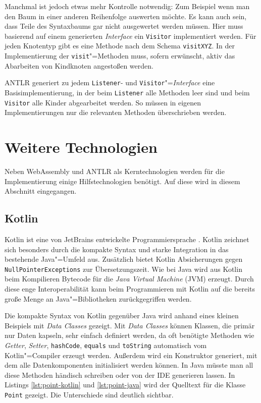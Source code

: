 Manchmal ist jedoch etwas mehr Kontrolle notwendig: Zum Beispiel wenn man den Baum in einer anderen Reihenfolge auswerten möchte. Es kann auch sein, dass Teile des Syntaxbaums gar nicht ausgewertet werden müssen. Hier muss basierend auf einem generierten \emph{Interface} ein \lstinline{Visitor} implementiert werden. Für jeden Knotentyp gibt es eine Methode nach dem Schema \lstinline{visitXYZ}. In der Implementierung der \lstinline{visit}"=Methoden muss, sofern erwünscht, aktiv das Abarbeiten von Kindknoten angestoßen werden.

ANTLR generiert zu jedem \lstinline{Listener}- und \lstinline{Visitor}"=\emph{Interface} eine Basisimplementierung, in der beim \lstinline{Listener} alle Methoden leer sind und beim \lstinline{Visitor} alle Kinder abgearbeitet werden. So müssen in eigenen Implementierungen nur die relevanten Methoden überschrieben werden.

\pagebreak
\section{Weitere Technologien}

Neben WebAssembly und ANTLR als Kerntechnologien werden für die Implementierung einige Hilfstechnologien benötigt. Auf diese wird in diesem Abschnitt eingegangen.

\subsection{Kotlin}
\label{subsec:Kotlin}

Kotlin ist eine von JetBrains entwickelte Programmiersprache \cite{KotlinReference}. Kotlin zeichnet sich besonders durch die kompakte Syntax und starke Integration in das bestehende Java"=Umfeld aus. Zusätzlich bietet Kotlin Absicherungen gegen \lstinline{NullPointerExceptions} zur Übersetzungszeit. Wie bei Java wird aus Kotlin beim Kompilieren Bytecode für die \emph{Java Virtual Machine} (JVM) erzeugt. Durch diese enge Interoperabilität kann beim Programmieren mit Kotlin auf die bereits große Menge an Java"=Bibliotheken zurückgegriffen werden.

Die kompakte Syntax von Kotlin gegenüber Java wird anhand eines kleinen Beispiels mit \emph{Data Classes} gezeigt. Mit \emph{Data Classes} können Klassen, die primär nur Daten kapseln, sehr einfach definiert werden, da oft benötigte Methoden wie \emph{Getter}, \emph{Setter}, \lstinline{hashCode}, \lstinline{equals} und \lstinline{toString} automatisch vom Kotlin"=Compiler erzeugt werden. Außerdem wird ein Konstruktor generiert, mit dem alle Datenkomponenten initialisiert werden können. In Java müsste man all diese Methoden händisch schreiben oder von der IDE generieren lassen. In Listings \ref{lst:point-kotlin} und \ref{lst:point-java} wird der Quelltext für die Klasse \lstinline{Point} gezeigt. Die Unterschiede sind deutlich sichtbar.

